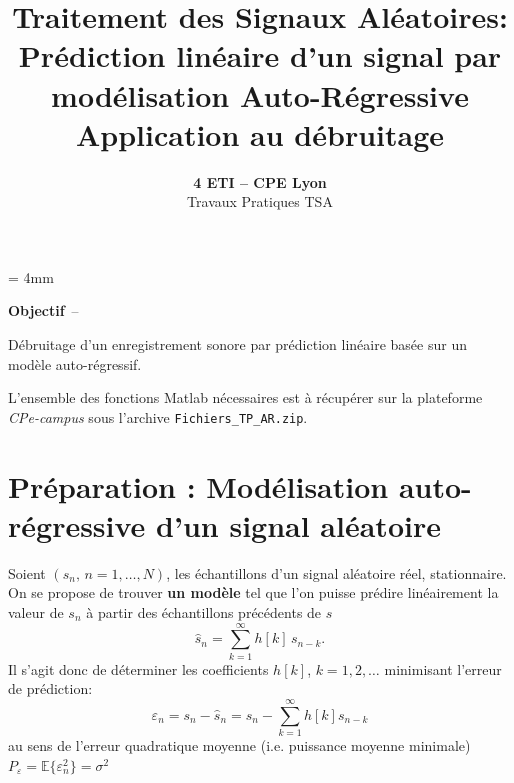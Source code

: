 \documentclass{article}
\begin{document}
\baselineskip = 4mm
\title{Traitement des Signaux Aléatoires: \\
Prédiction linéaire d'un signal par modélisation Auto-Régressive \\
Application au débruitage}

\author{\textbf{4 ETI -- CPE Lyon }\\[3mm]
{Travaux Pratiques TSA}}
\date{}

\maketitle

\noindent{}
\vspace*{5mm}



{\Large\bf Objectif}~--~~\begin{minipage}[t]{135mm}
Débruitage d'un enregistrement sonore par prédiction linéaire basée sur un modèle auto-régressif.

\vspace*{4mm}
L'ensemble des fonctions Matlab nécessaires est à récupérer sur la  plateforme {\em CPe-campus} sous l'archive {\tt Fichiers\_TP\_AR.zip}.
\end{minipage}

\vspace*{4mm}
\renewcommand{\thesection}{\Roman{section}}

\section{Préparation : Modélisation auto-régressive d'un signal aléatoire}

Soient $(s_n,\,n=1,\ldots, N)$, les échantillons d'un signal aléatoire réel, stationnaire. On se propose de trouver \textbf{un modèle} tel que l'on puisse prédire linéairement la valeur de $s_n$  à partir des échantillons précédents de $s$
\begin{equation}
\hat{s}_n = \sum_{k=1}^{\infty} h[k]\,s_{n-k}.
\label{eq:AR(M)}\end{equation}
Il s'agit donc de déterminer les coefficients  $h[k]$, $k=1,2,\ldots$  minimisant l'erreur de prédiction:
\begin{equation}
\varepsilon_n = s_n - \hat{s}_n = s_n - \sum_{k=1}^{\infty} h[k] s_{n-k}
\label{eq:erreur}
\end{equation}
au sens de l'erreur quadratique  moyenne (i.e. puissance moyenne minimale) $P_{\varepsilon} = \mathbb{E}\{ \varepsilon^2_n\} = \sigma^2$
\end{document}
